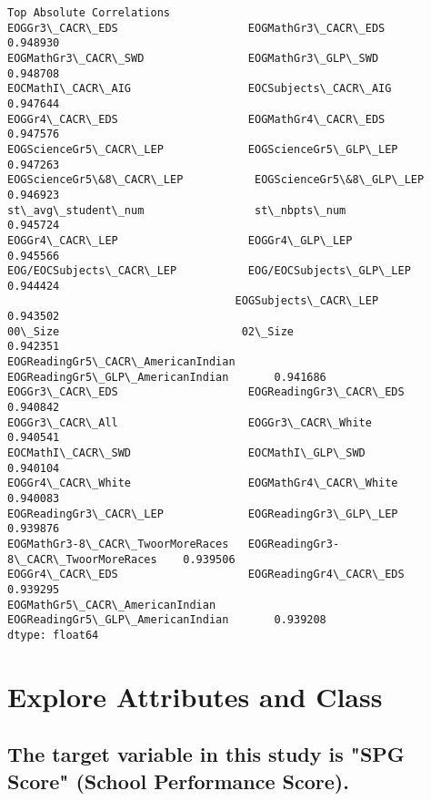 \documentclass[11pt]{article}
\begin{document}
    \begin{Verbatim}[commandchars=\\\{\}]
Top Absolute Correlations
EOGGr3\_CACR\_EDS                    EOGMathGr3\_CACR\_EDS                    0.948930
EOGMathGr3\_CACR\_SWD                EOGMathGr3\_GLP\_SWD                     0.948708
EOCMathI\_CACR\_AIG                  EOCSubjects\_CACR\_AIG                   0.947644
EOGGr4\_CACR\_EDS                    EOGMathGr4\_CACR\_EDS                    0.947576
EOGScienceGr5\_CACR\_LEP             EOGScienceGr5\_GLP\_LEP                  0.947263
EOGScienceGr5\&8\_CACR\_LEP           EOGScienceGr5\&8\_GLP\_LEP                0.946923
st\_avg\_student\_num                 st\_nbpts\_num                           0.945724
EOGGr4\_CACR\_LEP                    EOGGr4\_GLP\_LEP                         0.945566
EOG/EOCSubjects\_CACR\_LEP           EOG/EOCSubjects\_GLP\_LEP                0.944424
                                   EOGSubjects\_CACR\_LEP                   0.943502
00\_Size                            02\_Size                                0.942351
EOGReadingGr5\_CACR\_AmericanIndian  EOGReadingGr5\_GLP\_AmericanIndian       0.941686
EOGGr3\_CACR\_EDS                    EOGReadingGr3\_CACR\_EDS                 0.940842
EOGGr3\_CACR\_All                    EOGGr3\_CACR\_White                      0.940541
EOCMathI\_CACR\_SWD                  EOCMathI\_GLP\_SWD                       0.940104
EOGGr4\_CACR\_White                  EOGMathGr4\_CACR\_White                  0.940083
EOGReadingGr3\_CACR\_LEP             EOGReadingGr3\_GLP\_LEP                  0.939876
EOGMathGr3-8\_CACR\_TwoorMoreRaces   EOGReadingGr3-8\_CACR\_TwoorMoreRaces    0.939506
EOGGr4\_CACR\_EDS                    EOGReadingGr4\_CACR\_EDS                 0.939295
EOGMathGr5\_CACR\_AmericanIndian     EOGReadingGr5\_GLP\_AmericanIndian       0.939208
dtype: float64

    \end{Verbatim}

    \section{Explore Attributes and
Class}\label{explore-attributes-and-class}

    \subsection{The target variable in this study is "SPG Score" (School
Performance
Score).}\label{the-target-variable-in-this-study-is-spg-score-school-performance-score.}
\end{document}
